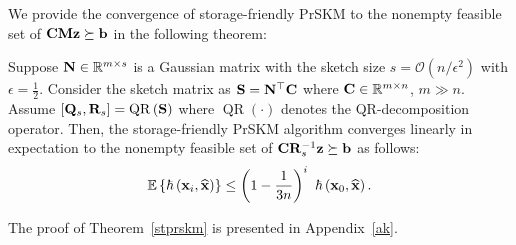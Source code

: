 \documentclass[12pt,draftcls,onecolumn]{IEEEtran}
\begin{document}
We provide the convergence of storage-friendly PrSKM to the nonempty feasible set of $\mathbf{C} \mathbf{M} \mathbf{z}\succeq\mathbf{b}$ in the following theorem:
\begin{theorem}
\label{stprskm}
Suppose $\mathbf{N}\in\mathbb{R}^{m\times s}$ is a Gaussian matrix with the sketch size $s=\mathcal{O}\left(n/\epsilon^{2}\right)$ with $\epsilon=\frac{1}{2}$. Consider the sketch matrix as $\mathbf{S}=\mathbf{N}^{\top}\mathbf{C}$ where $\mathbf{C}\in\mathbb{R}^{m\times n}$, $m\gg n$. Assume $\left[\mathbf{Q}_s,\mathbf{R}_s\right]=\operatorname{QR}\left(\mathbf{S}\right)$ where $\operatorname{QR}(\cdot)$ denotes the QR-decomposition operator. Then, the storage-friendly PrSKM algorithm converges linearly in expectation to the nonempty feasible set of $\mathbf{C}\mathbf{R}_{s}^{-1} \mathbf{z}\succeq\mathbf{b}$ as follows:
\begin{equation}
\label{stprskm1}
\mathbb{E}\left\{\hbar\left(\mathbf{x}_{i},\widehat{\mbx}\right)\right\}\leq\left(1-\frac{1}{3 n}\right)^{i}~ \hbar\left(\mathbf{x}_{0},\widehat{\mbx}\right).
\end{equation}
\end{theorem}\normalsize
The proof of Theorem~\ref{stprskm} is presented in Appendix~\ref{ak}.
\end{document}
